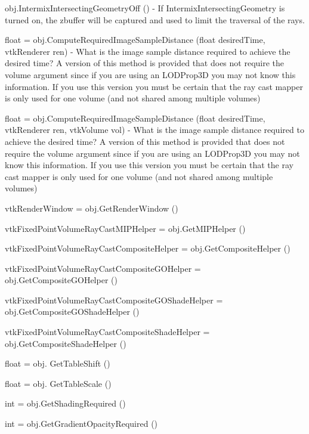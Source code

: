 \begin{DoxyItemize}
\item {\ttfamily obj.\-Intermix\-Intersecting\-Geometry\-Off ()} -\/ If Intermix\-Intersecting\-Geometry is turned on, the zbuffer will be captured and used to limit the traversal of the rays.  
\item {\ttfamily float = obj.\-Compute\-Required\-Image\-Sample\-Distance (float desired\-Time, vtk\-Renderer ren)} -\/ What is the image sample distance required to achieve the desired time? A version of this method is provided that does not require the volume argument since if you are using an L\-O\-D\-Prop3\-D you may not know this information. If you use this version you must be certain that the ray cast mapper is only used for one volume (and not shared among multiple volumes)  
\item {\ttfamily float = obj.\-Compute\-Required\-Image\-Sample\-Distance (float desired\-Time, vtk\-Renderer ren, vtk\-Volume vol)} -\/ What is the image sample distance required to achieve the desired time? A version of this method is provided that does not require the volume argument since if you are using an L\-O\-D\-Prop3\-D you may not know this information. If you use this version you must be certain that the ray cast mapper is only used for one volume (and not shared among multiple volumes)  
\item {\ttfamily vtk\-Render\-Window = obj.\-Get\-Render\-Window ()}  
\item {\ttfamily vtk\-Fixed\-Point\-Volume\-Ray\-Cast\-M\-I\-P\-Helper = obj.\-Get\-M\-I\-P\-Helper ()}  
\item {\ttfamily vtk\-Fixed\-Point\-Volume\-Ray\-Cast\-Composite\-Helper = obj.\-Get\-Composite\-Helper ()}  
\item {\ttfamily vtk\-Fixed\-Point\-Volume\-Ray\-Cast\-Composite\-G\-O\-Helper = obj.\-Get\-Composite\-G\-O\-Helper ()}  
\item {\ttfamily vtk\-Fixed\-Point\-Volume\-Ray\-Cast\-Composite\-G\-O\-Shade\-Helper = obj.\-Get\-Composite\-G\-O\-Shade\-Helper ()}  
\item {\ttfamily vtk\-Fixed\-Point\-Volume\-Ray\-Cast\-Composite\-Shade\-Helper = obj.\-Get\-Composite\-Shade\-Helper ()}  
\item {\ttfamily float = obj. Get\-Table\-Shift ()}  
\item {\ttfamily float = obj. Get\-Table\-Scale ()}  
\item {\ttfamily int = obj.\-Get\-Shading\-Required ()}  
\item {\ttfamily int = obj.\-Get\-Gradient\-Opacity\-Required ()}  

\end{DoxyItemize}
